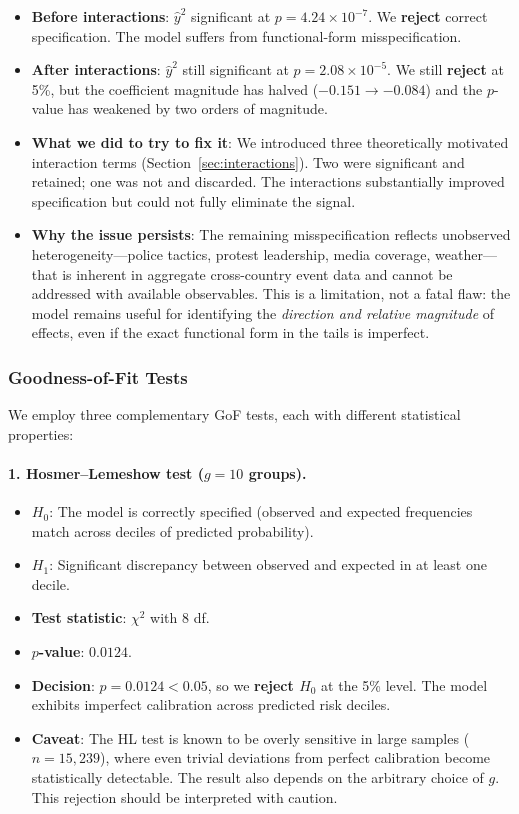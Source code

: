 \documentclass[12pt,a4paper]{article}
\begin{document}
\begin{itemize}
  \item \textbf{Before interactions}: $\hat{y}^2$ significant at $p = 4.24 \times 10^{-7}$. We \textbf{reject} correct specification. The model suffers from functional-form misspecification.
  \item \textbf{After interactions}: $\hat{y}^2$ still significant at $p = 2.08 \times 10^{-5}$. We still \textbf{reject} at 5\%, but the coefficient magnitude has halved ($-0.151 \to -0.084$) and the $p$-value has weakened by two orders of magnitude.
  \item \textbf{What we did to try to fix it}: We introduced three theoretically motivated interaction terms (Section~\ref{sec:interactions}). Two were significant and retained; one was not and discarded. The interactions substantially improved specification but could not fully eliminate the signal.
  \item \textbf{Why the issue persists}: The remaining misspecification reflects unobserved heterogeneity---police tactics, protest leadership, media coverage, weather---that is inherent in aggregate cross-country event data and cannot be addressed with available observables. This is a limitation, not a fatal flaw: the model remains useful for identifying the \emph{direction and relative magnitude} of effects, even if the exact functional form in the tails is imperfect.
\end{itemize}

\subsubsection{Goodness-of-Fit Tests}

We employ three complementary GoF tests, each with different statistical properties:

\paragraph{1. Hosmer--Lemeshow test ($g = 10$ groups).}
\begin{itemize}
  \item $H_0$: The model is correctly specified (observed and expected frequencies match across deciles of predicted probability).
  \item $H_1$: Significant discrepancy between observed and expected in at least one decile.
  \item \textbf{Test statistic}: $\chi^2$ with 8 df.
  \item \textbf{$p$-value}: $0.0124$.
  \item \textbf{Decision}: $p = 0.0124 < 0.05$, so we \textbf{reject $H_0$} at the 5\% level. The model exhibits imperfect calibration across predicted risk deciles.
  \item \textbf{Caveat}: The HL test is known to be overly sensitive in large samples ($n = 15{,}239$), where even trivial deviations from perfect calibration become statistically detectable. The result also depends on the arbitrary choice of $g$. This rejection should be interpreted with caution.
\end{itemize}
\end{document}

